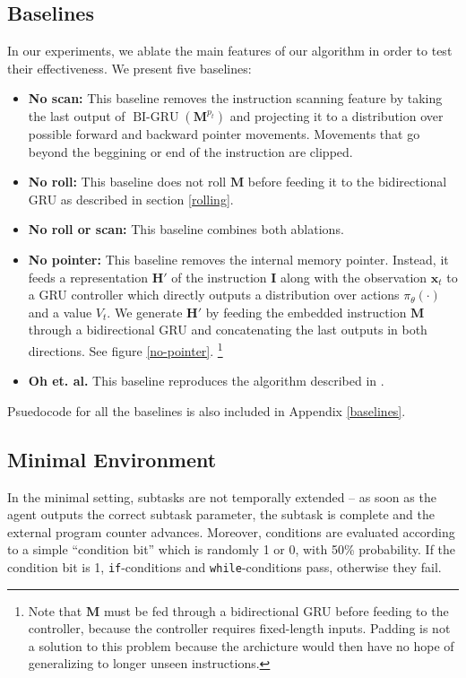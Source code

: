 \documentclass{article}
\DeclareMathOperator{\BIGRU}{BI-GRU}
\begin{document}
\subsection{Baselines}
In our experiments, we ablate the main features of our algorithm in order to
test their effectiveness. We present five baselines:
\begin{itemize}
  \item \textbf{No scan:} This baseline removes the instruction scanning feature by
    taking the last output of $\BIGRU(\mathbf{M}^{p_t})$ and projecting it to
    a distribution over possible forward and backward pointer movements.
    Movements that go beyond the beggining or end of the instruction are clipped.
  \item \textbf{No roll:} This baseline does not roll $\mathbf{M}$ before feeding
    it to the bidirectional GRU as described in section \ref{rolling}.
  \item \textbf{No roll or scan:} This baseline combines both ablations.
  \item \textbf{No pointer:} This baseline removes the internal memory pointer.
    Instead, it feeds a representation $\mathbf{H}'$ of the instruction
    $\mathbf{I}$ along with the observation $\mathbf{x}_t$ to a GRU controller
    which directly outputs a distribution over actions $\pi_\theta(\cdot)$ and a
    value $V_t$. We generate $\mathbf{H}'$ by feeding the embedded instruction
    $\mathbf{M}$ through a bidirectional GRU and concatenating the last outputs
    in both directions. See figure \ref{no-pointer}. \footnote{Note that $\mathbf{M}$
    must be fed through a bidirectional GRU before feeding to the controller,
  because the controller requires fixed-length inputs. Padding is not a solution
to this problem because the archicture would then have no hope of generalizing
to longer unseen instructions.}
  \item \textbf{Oh et. al.} This baseline reproduces the algorithm described in
    \cite{oh2017zero}.
\end{itemize}
Psuedocode for all the baselines is also included in Appendix \ref{baselines}.

\subsection{Minimal Environment}
In the minimal setting, subtasks are not
temporally extended -- as soon as the agent outputs the correct subtask
parameter, the subtask is complete and the external program counter advances.
Moreover, conditions are evaluated according to a simple ``condition bit'' which
is randomly 1 or 0, with 50\% probability. If the condition bit is 1,
\texttt{if}-conditions and \texttt{while}-conditions pass, otherwise they fail.
\end{document}
